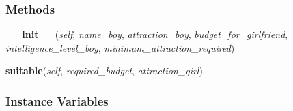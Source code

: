 
  \subsubsection{Methods}

    \label{boy_class:boy:__init__}

    \vspace{0.5ex}

\hspace{.8\funcindent}\begin{boxedminipage}{\funcwidth}

    \raggedright \textbf{\_\_init\_\_}(\textit{self}, \textit{name\_boy}, \textit{attraction\_boy}, \textit{budget\_for\_girlfriend}, \textit{intelligence\_level\_boy}, \textit{minimum\_attraction\_required})

\setlength{\parskip}{2ex}
\setlength{\parskip}{1ex}
    \end{boxedminipage}

    \label{boy_class:boy:suitable}

    \vspace{0.5ex}

\hspace{.8\funcindent}\begin{boxedminipage}{\funcwidth}

    \raggedright \textbf{suitable}(\textit{self}, \textit{required\_budget}, \textit{attraction\_girl})

\setlength{\parskip}{2ex}
\setlength{\parskip}{1ex}
    \end{boxedminipage}



  \subsubsection{Instance Variables}

